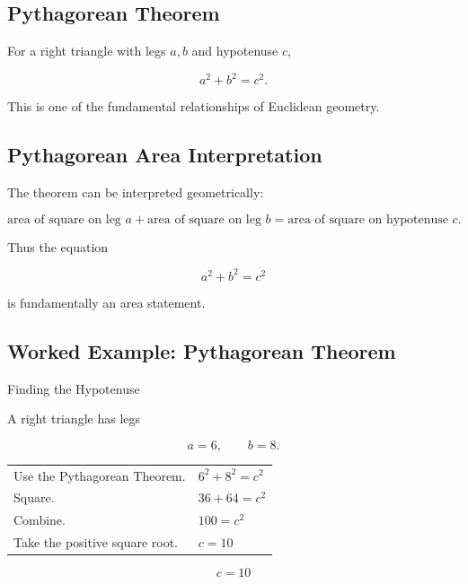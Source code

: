 \subsection{Pythagorean Theorem}
\label{subsec:pythagorean-theorem}

\begin{theorem}
For a right triangle with legs \(a,b\) and hypotenuse \(c\),

\[ \boxed{a^2+b^2=c^2.} \]
\end{theorem}

This is one of the fundamental relationships of Euclidean geometry.

\subsection{Pythagorean Area Interpretation}
\label{subsec:pythagorean-area-interpretation}

The theorem can be interpreted geometrically:

\[
\boxed{
\text{area of square on leg }a
+
\text{area of square on leg }b
=
\text{area of square on hypotenuse }c.
}
\]

Thus the equation

\[ a^2+b^2=c^2 \]

is fundamentally an area statement.

\subsection{Worked Example: Pythagorean Theorem}
\label{subsec:worked-pythagorean}

\begin{workedexamplebox}{Finding the Hypotenuse}

A right triangle has legs

\[ a=6,\qquad b=8. \]

\begin{tabularx}{\textwidth}{@{}>{\raggedright\arraybackslash}p{}X@{}}
Use the Pythagorean Theorem. & \(6^2+8^2=c^2\)\\
Square. & \(36+64=c^2\)\\
Combine. & \(100=c^2\)\\
Take the positive square root. & \(c=10\)
\end{tabularx}

\begin{answerbox}
\[ \boxed{c=10} \]
\end{answerbox}
\end{workedexamplebox}

